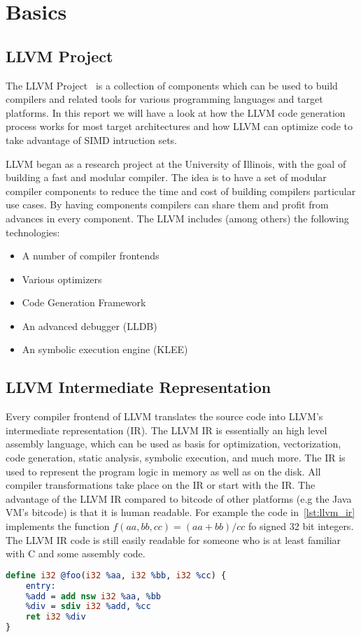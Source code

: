 \section{Basics}
\subsection{LLVM Project}

The LLVM Project~\cite{LLVM:CGO04} is a collection of components which can be used to build compilers and related tools
for various programming languages and target platforms.
In this report we will have a look at how the LLVM code generation process works for most target architectures
and how LLVM can optimize code to take advantage of SIMD intruction sets.

LLVM began as a research project at the University of Illinois, with the goal of building a fast and modular compiler.
The idea is to have a set of modular compiler components to reduce the time and cost of building compilers
particular use cases. By having components compilers can share them and profit from advances in every component.
The LLVM includes (among others) the following technologies:
\begin{itemize}
    \item A number of compiler frontends
    \item Various optimizers
    \item Code Generation Framework
    \item An advanced debugger (LLDB)
    \item An symbolic execution engine (KLEE)
\end{itemize}

\subsection{LLVM Intermediate Representation}
\label{subsec:llvm_ir}

Every compiler frontend of LLVM translates the source code into LLVM's intermediate representation (IR).
The LLVM IR is essentially an high level assembly language, which can be used as basis for optimization,
vectorization, code generation, static analysis, symbolic execution, and much more.
The IR is used to represent the program logic in memory as well as on the disk. All compiler transformations
take place on the IR or start with the IR. The advantage of the LLVM IR compared to bitcode of other platforms
(e.g the Java VM's bitcode) is that it is human readable. For example the code in~\ref{lst:llvm_ir} implements
the function $f(aa, bb, cc) = (aa + bb) / cc$ fo signed 32 bit integers. The LLVM IR code is still easily
readable for someone who is at least familiar with C and some assembly code. 
\label{lst:llvm_ir}
\begin{lstlisting}[language=LLVM,gobble=4]
define i32 @foo(i32 %aa, i32 %bb, i32 %cc) {
    entry:
    %add = add nsw i32 %aa, %bb
    %div = sdiv i32 %add, %cc
    ret i32 %div
}
\end{lstlisting}

